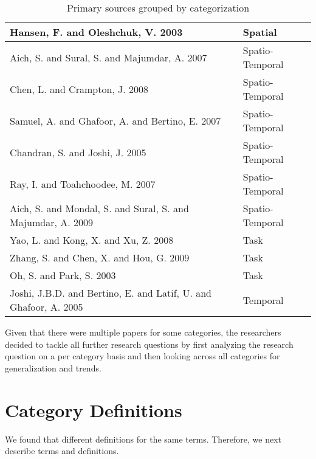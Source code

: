 \begin{table}
\begin{tabular}{|p{12.5cm}|p{3cm}|}
Hansen, F. and Oleshchuk, V. 2003 \cite{hansen2003spatial} & Spatial \\\hline
Aich, S. and Sural, S. and Majumdar, A. 2007 \cite{aich07:STARBAC} & Spatio-Temporal \\\hline
Chen, L. and Crampton, J. 2008 \cite{chen08:spatio-temporal} & Spatio-Temporal \\\hline
Samuel, A. and Ghafoor, A. and Bertino, E. 2007 \cite{samuel07:spatio-temporal} & Spatio-Temporal \\\hline
Chandran, S. and Joshi, J. 2005 \cite{chandran05:llt} & Spatio-Temporal \\\hline
Ray, I. and Toahchoodee, M. 2007 \cite{ray07:spatio} & Spatio-Temporal \\\hline
Aich, S. and Mondal, S. and Sural, S. and Majumdar, A. 2009 \cite{aich09:role} & Spatio-Temporal \\\hline
Yao, L. and Kong, X. and Xu, Z. 2008 \cite{yao2008task} & Task \\\hline
Zhang, S. and Chen, X. and Hou, G. 2009 \cite{zhou2007team} & Task \\\hline
Oh, S. and Park, S. 2003 \cite{oh2003task} & Task \\\hline
Joshi, J.B.D. and Bertino, E. and Latif, U. and Ghafoor, A. 2005 \cite{joshi05:generalized} & Temporal \\\hline

\end{tabular}
\caption{Primary sources grouped by categorization}
\label{tab:categorization}
\end{table}

Given that there were multiple papers for some categories, the researchers decided to tackle all further research questions by first analyzing the research question on a per category basis and then looking across all categories for generalization and trends.

\section{Category Definitions} \label{sec:terms}

We found that different definitions for the same terms. Therefore, we next describe
terms and definitions.

